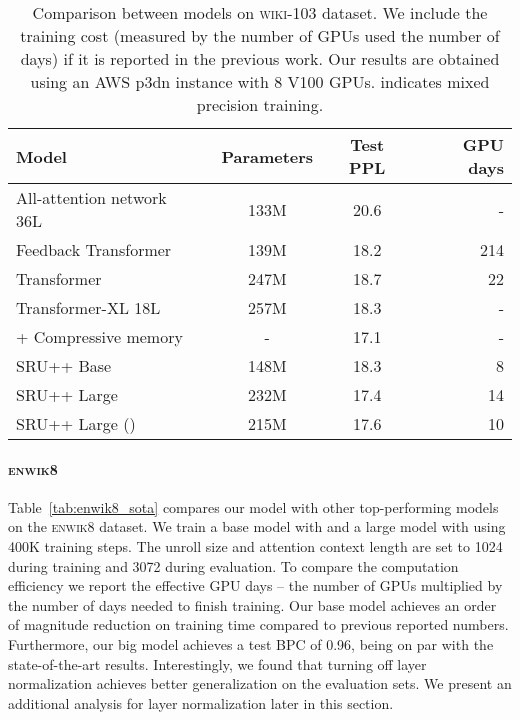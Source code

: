 \documentclass[11pt,a4paper]{article}
\begin{document}
\begin{table*}[t!]
    \centering
    \begin{tabular}{lccr}
    \toprule
    \bf Model & \bf Parameters  & \bf Test PPL  & \bf GPU days \\
    \hline
    All-attention network 36L~\cite{sukhbaatar2019augmenting} & 133M & 20.6 & -\\
    Feedback Transformer~\cite{fan2020accessing} & 139M & 18.2 & 214\\
    Transformer~\cite{baevski2018adaptive} & 247M & 18.7 & 22\\
    Transformer-XL 18L~\cite{dai-etal-2019-transformer} & 257M & 18.3 & - \\
    + Compressive memory~\cite{Rae2020Compressive} & - & 17.1 & -\\
    \hline
SRU++ Base & 148M & 18.3 & 8 \\
    \hdashline
    SRU++ Large & 232M & 17.4 & 14 \\
    SRU++ Large () & 215M & 17.6  & 10 \\
\bottomrule
    \end{tabular}
    \caption{Comparison between models on \textsc{wiki-103} dataset. We include the training cost (measured by the number of GPUs used  the number of days) if it is reported in the previous work. Our results are obtained using an AWS p3dn instance with 8 V100 GPUs.  indicates mixed precision training.}
    \label{tab:wit103_sota}
\end{table*}

\paragraph{\textsc{enwik8}}
Table~\ref{tab:enwik8_sota} compares our model with other top-performing models on the \textsc{enwik8} dataset.
We train a base model with  and a large model with  using 400K training steps.
The unroll size and attention context length are set to 1024 during training and 3072 during evaluation.
To compare the computation efficiency we report the effective GPU days -- the number of GPUs multiplied by the number of days needed to finish training. 
Our base model achieves an order of magnitude reduction on training time compared to previous reported numbers.
Furthermore, our big model achieves a test BPC of 0.96, being on par with the state-of-the-art results.
Interestingly, we found that turning off layer normalization achieves better generalization on the evaluation sets.
We present an additional analysis for layer normalization later in this section.
\end{document}
